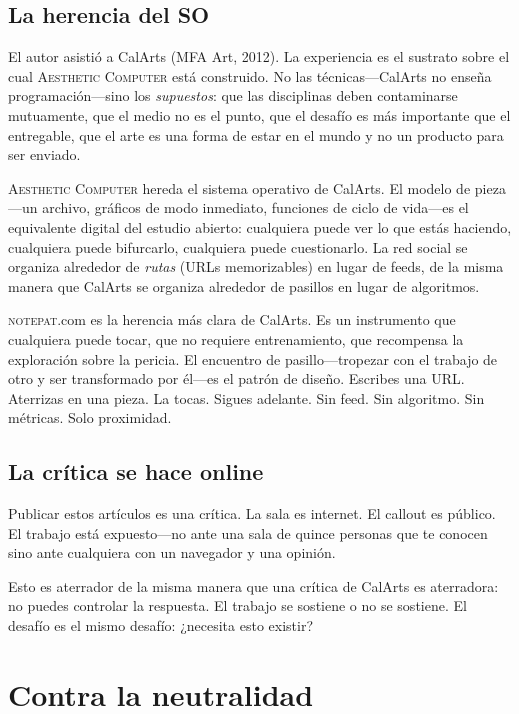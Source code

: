 \documentclass[10pt,letterpaper,twocolumn]{article}
\newcommand{\ac}{\textsc{Aesthetic Computer}}
\newcommand{\np}{\textsc{notepat}}
\begin{document}
\subsection{La herencia del SO}

El autor asistió a CalArts (MFA Art, 2012). La experiencia es el sustrato sobre el cual \ac{} está construido. No las técnicas---CalArts no enseña programación---sino los \emph{supuestos}: que las disciplinas deben contaminarse mutuamente, que el medio no es el punto, que el desafío es más importante que el entregable, que el arte es una forma de estar en el mundo y no un producto para ser enviado.

\ac{} hereda el sistema operativo de CalArts. El modelo de pieza---un archivo, gráficos de modo inmediato, funciones de ciclo de vida---es el equivalente digital del estudio abierto: cualquiera puede ver lo que estás haciendo, cualquiera puede bifurcarlo, cualquiera puede cuestionarlo. La red social se organiza alrededor de \emph{rutas} (URLs memorizables) en lugar de feeds, de la misma manera que CalArts se organiza alrededor de pasillos en lugar de algoritmos.

\np{}.com es la herencia más clara de CalArts. Es un instrumento que cualquiera puede tocar, que no requiere entrenamiento, que recompensa la exploración sobre la pericia. El encuentro de pasillo---tropezar con el trabajo de otro y ser transformado por él---es el patrón de diseño. Escribes una URL. Aterrizas en una pieza. La tocas. Sigues adelante. Sin feed. Sin algoritmo. Sin métricas. Solo proximidad.

\subsection{La crítica se hace online}

Publicar estos artículos es una crítica. La sala es internet. El callout es público. El trabajo está expuesto---no ante una sala de quince personas que te conocen sino ante cualquiera con un navegador y una opinión.

Esto es aterrador de la misma manera que una crítica de CalArts es aterradora: no puedes controlar la respuesta. El trabajo se sostiene o no se sostiene. El desafío es el mismo desafío: ¿necesita esto existir?

\section{Contra la neutralidad}
\end{document}
